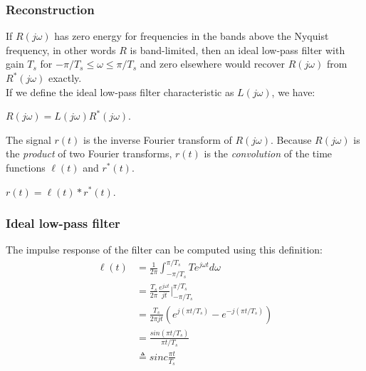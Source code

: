 \begin{frame}
	\frametitle{Reconstruction}
	If $R(j\omega)$ has zero energy for frequencies in the bands above the Nyquist frequency, in other words $R$ is band-limited, then an ideal low-pass filter with gain $T_s$ for $-\pi/T_s \leq \omega \leq \pi/T_s$ and zero elsewhere would recover $R(j\omega)$ from $R^*(j\omega)$ exactly.\\
	\medskip
	If we define the ideal low-pass filter characteristic as $L(j\omega)$, we have:
	\begin{center}
		$R(j\omega)=L(j\omega)R^*(j\omega)$.
	\end{center}
	The signal $r(t)$ is the inverse Fourier transform of $R(j\omega)$. Because $R(j\omega)$ is the \textit{product} of two Fourier transforms, $r(t)$ is the \textit{convolution} of the time functions $\ell(t)$ and $r^*(t)$.\\
	\begin{center}
		$r(t) = \ell(t) * r^*(t)$.
	\end{center}
\end{frame}

\begin{frame}
	\frametitle{Ideal low-pass filter}
	The impulse response of the filter can be computed using this definition:\\
	\vspace{-1em}
	\begin{equation}
	\begin{split}
	\ell(t) & = \frac{1}{2\pi} \int_{-\pi/T_s}^{\pi/T_s}Te^{j\omega t}d\omega\\
	& = \frac{T_s}{2\pi} \frac{e^{j\omega t}}{jt} \Big|_{-\pi/T_s}^{\pi/T_s}\\
	& = \frac{T_s}{2\pi jt}(e^{j(\pi t/T_s)}-e^{-j(\pi t/T_s)})\\
	& = \frac{sin(\pi t/T_s)}{\pi t/T_s}\\
	& \triangleq sinc\frac{\pi t}{T_s} \nonumber
	\end{split}
	\end{equation}
\end{frame}


